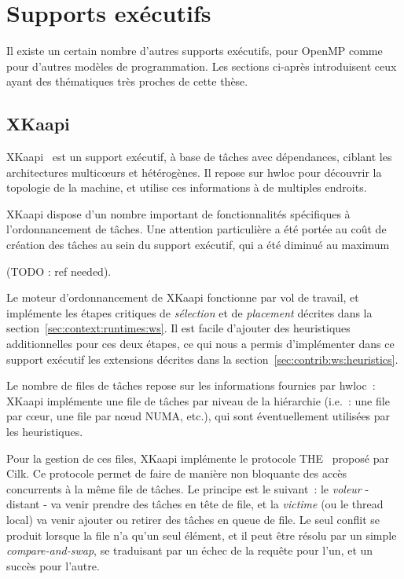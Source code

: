 \section{Supports exécutifs}\label{sec:rw:other-runtimes}

Il existe un certain nombre d'autres supports exécutifs, pour OpenMP comme pour d'autres modèles de programmation.
Les sections ci-après introduisent ceux ayant des thématiques très proches de cette thèse.

\subsection{XKaapi}

XKaapi~\cite{Gautier2007} est un support exécutif, à base de tâches avec dépendances, ciblant les architectures multicœurs et hétérogènes.
Il repose sur hwloc pour découvrir la topologie de la machine, et utilise ces informations à de multiples endroits.

XKaapi dispose d'un nombre important de fonctionnalités spécifiques à l'ordonnancement de tâches.
Une attention particulière a été portée au coût de création des tâches au sein du support exécutif, qui a été diminué au maximum
\begin{todo}
(TODO : ref needed).
\end{todo}

Le moteur d'ordonnancement de XKaapi fonctionne par vol de travail, et implémente les étapes critiques de \emph{sélection} et de \emph{placement} décrites dans la section~\ref{sec:context:runtimes:ws}. Il est facile d'ajouter des heuristiques additionnelles pour ces deux étapes, ce qui nous a permis d'implémenter dans ce support exécutif les extensions décrites dans la section~\ref{sec:contrib:ws:heuristics}.

Le nombre de files de tâches repose sur les informations fournies par hwloc~: XKaapi implémente une file de tâches par niveau de la hiérarchie (i.e.~: une file par cœur, une file par nœud NUMA, etc.), qui sont éventuellement utilisées par les heuristiques.

Pour la gestion de ces files, XKaapi implémente le protocole THE~\cite{cilk5} proposé par Cilk. Ce protocole permet de faire de manière non bloquante des accès concurrents à la même file de tâches. Le principe est le suivant~: le \emph{voleur} - distant - va venir prendre des tâches en tête de file, et la \emph{victime} (ou le thread local) va venir ajouter ou retirer des tâches en queue de file.
Le seul conflit se produit lorsque la file n'a qu'un seul élément, et il peut être résolu par un simple \emph{compare-and-swap}, se traduisant par un échec de la requête pour l'un, et un succès pour l'autre.

